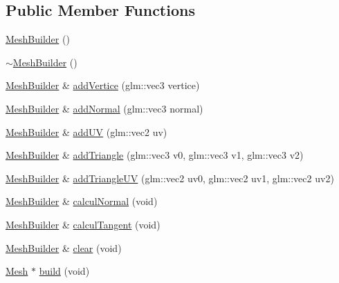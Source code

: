 \subsection*{Public Member Functions}
\begin{DoxyCompactItemize}
\item 
\mbox{\hyperlink{class_beer_engine_1_1_graphics_1_1_mesh_builder_a37188d6e052302a6492e8c32499ebcac}{Mesh\+Builder}} ()
\item 
\mbox{\hyperlink{class_beer_engine_1_1_graphics_1_1_mesh_builder_aa83ee10b505b83585ef5a6d4d21ff65b}{$\sim$\+Mesh\+Builder}} ()
\item 
\mbox{\hyperlink{class_beer_engine_1_1_graphics_1_1_mesh_builder}{Mesh\+Builder}} \& \mbox{\hyperlink{class_beer_engine_1_1_graphics_1_1_mesh_builder_a9a6d36b00e8e62ab40a54f06545727ef}{add\+Vertice}} (glm\+::vec3 vertice)
\item 
\mbox{\hyperlink{class_beer_engine_1_1_graphics_1_1_mesh_builder}{Mesh\+Builder}} \& \mbox{\hyperlink{class_beer_engine_1_1_graphics_1_1_mesh_builder_a2b60b866d1d46a2011dd7ea406613337}{add\+Normal}} (glm\+::vec3 normal)
\item 
\mbox{\hyperlink{class_beer_engine_1_1_graphics_1_1_mesh_builder}{Mesh\+Builder}} \& \mbox{\hyperlink{class_beer_engine_1_1_graphics_1_1_mesh_builder_a7644037a2b65d5369063b353e0a1161f}{add\+UV}} (glm\+::vec2 uv)
\item 
\mbox{\hyperlink{class_beer_engine_1_1_graphics_1_1_mesh_builder}{Mesh\+Builder}} \& \mbox{\hyperlink{class_beer_engine_1_1_graphics_1_1_mesh_builder_ad652a03729f4938ce4d198edf4ab6abe}{add\+Triangle}} (glm\+::vec3 v0, glm\+::vec3 v1, glm\+::vec3 v2)
\item 
\mbox{\hyperlink{class_beer_engine_1_1_graphics_1_1_mesh_builder}{Mesh\+Builder}} \& \mbox{\hyperlink{class_beer_engine_1_1_graphics_1_1_mesh_builder_a99f5b7d008ee3a621835db8b2c5ef5c8}{add\+Triangle\+UV}} (glm\+::vec2 uv0, glm\+::vec2 uv1, glm\+::vec2 uv2)
\item 
\mbox{\hyperlink{class_beer_engine_1_1_graphics_1_1_mesh_builder}{Mesh\+Builder}} \& \mbox{\hyperlink{class_beer_engine_1_1_graphics_1_1_mesh_builder_a65981a84e64924a36bc208614844e34b}{calcul\+Normal}} (void)
\item 
\mbox{\hyperlink{class_beer_engine_1_1_graphics_1_1_mesh_builder}{Mesh\+Builder}} \& \mbox{\hyperlink{class_beer_engine_1_1_graphics_1_1_mesh_builder_a433beadaa7c9ed25dc913e40a99da421}{calcul\+Tangent}} (void)
\item 
\mbox{\hyperlink{class_beer_engine_1_1_graphics_1_1_mesh_builder}{Mesh\+Builder}} \& \mbox{\hyperlink{class_beer_engine_1_1_graphics_1_1_mesh_builder_abeb4d8dbeb9096e1fa2c746856356709}{clear}} (void)
\item 
\mbox{\hyperlink{class_beer_engine_1_1_graphics_1_1_mesh}{Mesh}} $\ast$ \mbox{\hyperlink{class_beer_engine_1_1_graphics_1_1_mesh_builder_a0a5704934acb9b6b2f5ffbdd01ae4c8b}{build}} (void)
\end{DoxyCompactItemize}


